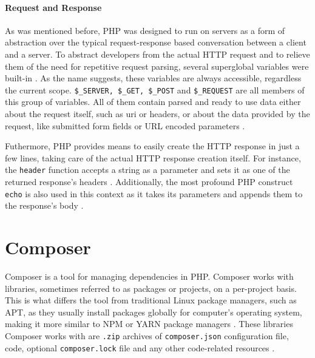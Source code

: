 \paragraph{Request and Response}
As was mentioned before, PHP was designed to run on servers as a form of abstraction over the typical request-response based conversation between a client and a server. To abstract developers from the actual HTTP request and to relieve them of the need for repetitive request parsing, several superglobal variables were built-in \citep{php.manual}. As the name suggests, these variables are always accessible, regardless the current scope. \texttt{\${\_}SERVER, \${\_}GET, \${\_}POST} and \texttt{\${\_}REQUEST} are all members of this group of variables. All of them contain parsed and ready to use data either about the request itself, such as uri or headers, or about the data provided by the request, like submitted form fields or URL encoded parameters \citep{php.manual}.

Futhermore, PHP provides means to easily create the HTTP response in just a few lines, taking care of the actual HTTP response creation itself. For instance, the \texttt{header} function accepts a string as a parameter and sets it as one of the returned response's headers \citep{php.manual}. Additionally, the most profound PHP construct \texttt{echo} is also used in this context as it takes its parameters and appends them to the response's body \citep{php.manual}. 



\section{Composer}
Composer is a tool for managing dependencies in PHP. Composer works with libraries, sometimes referred to as packages or projects, on a per-project basis. This is what differs the tool from traditional Linux package managers, such as APT, as they usually install packages globally for computer's operating system, making it more similar to NPM or YARN package managers \citep{composer.docs}. These libraries Composer works with are \texttt{.zip} archives of \texttt{composer.json} configuration file, code, optional \texttt{composer.lock} file and any other code-related resources \citep{composer.docs}.

